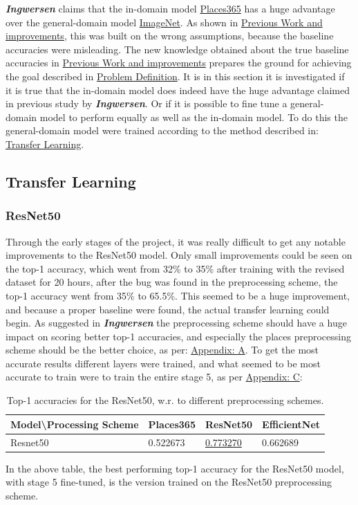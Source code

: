 \textbf{\textit{Ingwersen}}\autocite{Ingwersen} claims that the in-domain model \hyperref[sec:Places365]{Places365} has a huge advantage over the general-domain model \hyperref[sec:ImageNet]{ImageNet}. As shown in \hyperref[Improvement]{Previous Work and improvements}, this was built on the wrong assumptions, because the baseline accuracies were misleading. The new knowledge obtained about the true baseline accuracies in \hyperref[Improvement]{Previous Work and improvements} prepares the ground for achieving the goal described in \hyperref[sec:Problem Definition]{Problem Definition}. It is in this section it is investigated if it is true that the in-domain model does indeed have the huge advantage claimed in previous study by \textbf{\textit{Ingwersen}}. Or if it is possible to fine tune a general-domain model to perform equally as well as the in-domain model. To do this the general-domain model were trained according to the method described in: \hyperref[methodTransferlearning]{Transfer Learning}.
\subsection{Transfer Learning}
\subsubsection{ResNet50}
Through the early stages of the project, it was really difficult to get any notable improvements to the ResNet50 model. Only small improvements could be seen on the top-1 accuracy, which went from 32\% to 35\% after training with the revised dataset for 20 hours, after the bug was found in the preprocessing scheme, the top-1 accuracy went from 35\% to 65.5\%. This seemed to be a huge improvement, and because a proper baseline were found, the actual transfer learning could begin. As suggested in \textbf{\textit{Ingwersen}} the preprocessing scheme should have a huge impact on scoring better top-1 accuracies, and especially the places preprocessing scheme should be the better choice, as per: \hyperref[appendix: A]{Appendix: A}. To get the most accurate results different layers were trained, and what seemed to be most accurate to train were to train the entire stage 5, as per \hyperref[appendix: C]{Appendix: C}:
\begin{table}[H]
  \centering
\begin{tabular}{llll}
Model\textbackslash{}Processing Scheme & Places365                        & ResNet50                                          & EfficientNet                  \\ \hline
\multicolumn{1}{|l|}{Resnet50}         & \multicolumn{1}{l|}{0.522673} & \multicolumn{1}{l|}{\underline{0.773270}}                     & \multicolumn{1}{l|}{0.662689} \\ \hline
\end{tabular}
\caption{Top-1 accuracies for the ResNet50, w.r. to different preprocessing schemes.}
\end{table}
In the above table, the best performing top-1 accuracy for the ResNet50 model, with stage 5 fine-tuned, is the version trained on the ResNet50 preprocessing scheme.
